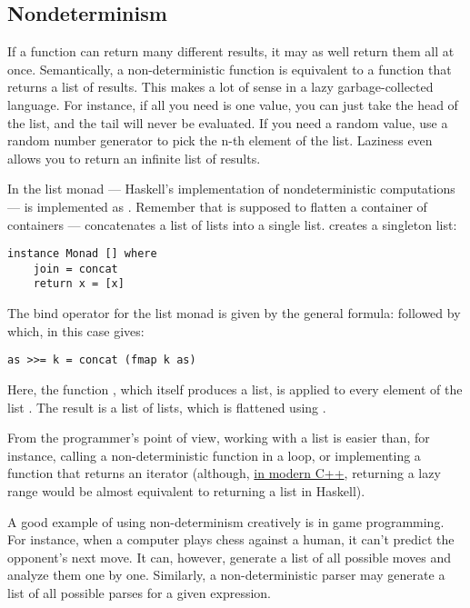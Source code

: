 \subsection{Nondeterminism}\label{nondeterminism}

If a function can return many different results, it may as well return
them all at once. Semantically, a non-deterministic function is
equivalent to a function that returns a list of results. This makes a
lot of sense in a lazy garbage-collected language. For instance, if all
you need is one value, you can just take the head of the list, and the
tail will never be evaluated. If you need a random value, use a random
number generator to pick the n-th element of the list. Laziness even
allows you to return an infinite list of results.

In the list monad --- Haskell's implementation of nondeterministic
computations ---  is implemented as .
Remember that  is supposed to flatten a container of
containers ---  concatenates a list of lists into a
single list.  creates a singleton list:

\begin{Verbatim}[commandchars=\\\{\}]
instance Monad [] where
    join = concat
    return x = [x]
\end{Verbatim}
The bind operator for the list monad is given by the general formula:
 followed by  which, in this case gives:

\begin{Verbatim}[commandchars=\\\{\}]
as >>= k = concat (fmap k as)
\end{Verbatim}
Here, the function , which itself produces a list, is applied
to every element of the list . The result is a list of lists,
which is flattened using .

From the programmer's point of view, working with a list is easier than,
for instance, calling a non-deterministic function in a loop, or
implementing a function that returns an iterator (although,
\href{http://ericniebler.com/2014/04/27/range-comprehensions/}{in modern
C++}, returning a lazy range would be almost equivalent to returning a
list in Haskell).

A good example of using non-determinism creatively is in game
programming. For instance, when a computer plays chess against a human,
it can't predict the opponent's next move. It can, however, generate a
list of all possible moves and analyze them one by one. Similarly, a
non-deterministic parser may generate a list of all possible parses for
a given expression.

